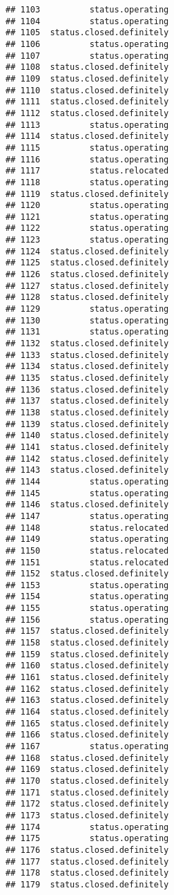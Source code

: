 \documentclass[
]{article}
\begin{document}
\begin{verbatim}
## 1103          status.operating
## 1104          status.operating
## 1105  status.closed.definitely
## 1106          status.operating
## 1107          status.operating
## 1108  status.closed.definitely
## 1109  status.closed.definitely
## 1110  status.closed.definitely
## 1111  status.closed.definitely
## 1112  status.closed.definitely
## 1113          status.operating
## 1114  status.closed.definitely
## 1115          status.operating
## 1116          status.operating
## 1117          status.relocated
## 1118          status.operating
## 1119  status.closed.definitely
## 1120          status.operating
## 1121          status.operating
## 1122          status.operating
## 1123          status.operating
## 1124  status.closed.definitely
## 1125  status.closed.definitely
## 1126  status.closed.definitely
## 1127  status.closed.definitely
## 1128  status.closed.definitely
## 1129          status.operating
## 1130          status.operating
## 1131          status.operating
## 1132  status.closed.definitely
## 1133  status.closed.definitely
## 1134  status.closed.definitely
## 1135  status.closed.definitely
## 1136  status.closed.definitely
## 1137  status.closed.definitely
## 1138  status.closed.definitely
## 1139  status.closed.definitely
## 1140  status.closed.definitely
## 1141  status.closed.definitely
## 1142  status.closed.definitely
## 1143  status.closed.definitely
## 1144          status.operating
## 1145          status.operating
## 1146  status.closed.definitely
## 1147          status.operating
## 1148          status.relocated
## 1149          status.operating
## 1150          status.relocated
## 1151          status.relocated
## 1152  status.closed.definitely
## 1153          status.operating
## 1154          status.operating
## 1155          status.operating
## 1156          status.operating
## 1157  status.closed.definitely
## 1158  status.closed.definitely
## 1159  status.closed.definitely
## 1160  status.closed.definitely
## 1161  status.closed.definitely
## 1162  status.closed.definitely
## 1163  status.closed.definitely
## 1164  status.closed.definitely
## 1165  status.closed.definitely
## 1166  status.closed.definitely
## 1167          status.operating
## 1168  status.closed.definitely
## 1169  status.closed.definitely
## 1170  status.closed.definitely
## 1171  status.closed.definitely
## 1172  status.closed.definitely
## 1173  status.closed.definitely
## 1174          status.operating
## 1175          status.operating
## 1176  status.closed.definitely
## 1177  status.closed.definitely
## 1178  status.closed.definitely
## 1179  status.closed.definitely

\end{verbatim}
\end{document}
